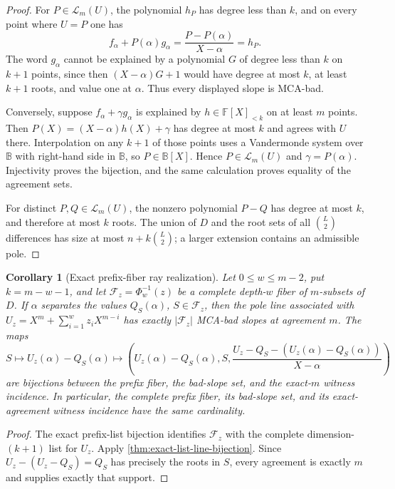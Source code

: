 \documentclass[11pt,a4paper]{amsart}
\numberwithin{equation}{section}
\newtheorem{corollary}[corollary]{Corollary}
\theoremstyle{remark}
\newcommand{\F}{\mathbb F}
\newcommand{\B}{\mathbb B}
\newcommand{\Fcal}{\mathcal F}
\newcommand{\Lcal}{\mathcal L}
\newcommand{\abs}[1]{\lvert #1\rvert}
\begin{document}
\begin{proof}
For \(P\in\Lcal_m(U)\), the polynomial \(h_P\) has degree less than
\(k\), and on every point where \(U=P\) one has
\[
 f_\alpha+P(\alpha)g_\alpha
   =\frac{P-P(\alpha)}{X-\alpha}=h_P.
\]
The word \(g_\alpha\) cannot be explained by a polynomial \(G\) of degree
less than \(k\) on \(k+1\) points, since then
\((X-\alpha)G+1\) would have degree at most \(k\), at least \(k+1\)
roots, and value one at \(\alpha\).  Thus every displayed slope is
MCA-bad.

Conversely, suppose \(f_\alpha+\gamma g_\alpha\) is explained by
\(h\in\F[X]_{<k}\) on at least \(m\) points.  Then
\(P(X)=(X-\alpha)h(X)+\gamma\) has degree at most \(k\) and agrees with
\(U\) there.  Interpolation on any \(k+1\) of those points uses a
Vandermonde system over \(\B\) with right-hand side in \(\B\), so
\(P\in\B[X]\).  Hence \(P\in\Lcal_m(U)\) and
\(\gamma=P(\alpha)\).  Injectivity proves the bijection, and the same
calculation proves equality of the agreement sets.

For distinct \(P,Q\in\Lcal_m(U)\), the nonzero polynomial \(P-Q\) has
degree at most \(k\), and therefore at most \(k\) roots.  The union of
\(D\) and the root sets of all \(\binom L2\) differences has size at most
\(n+k\binom L2\); a larger extension contains an admissible pole.
\end{proof}

\begin{corollary}[Exact prefix-fiber ray realization]
\label{cor:exact-prefix-ray-realization}
Let \(0\le w\le m-2\), put \(k=m-w-1\), and let
\(\Fcal_z=\Phi_w^{-1}(z)\) be a complete depth-\(w\) fiber of
\(m\)-subsets of \(D\).  If \(\alpha\) separates the values
\(Q_S(\alpha)\), \(S\in\Fcal_z\), then the pole line associated with
\(U_z=X^m+\sum_{i=1}^wz_iX^{m-i}\) has exactly
\(\abs{\Fcal_z}\) MCA-bad slopes at agreement \(m\).  The maps
\[
 S\longmapsto U_z(\alpha)-Q_S(\alpha)
 \longmapsto
 \left(U_z(\alpha)-Q_S(\alpha),S,
 \frac{U_z-Q_S-(U_z(\alpha)-Q_S(\alpha))}{X-\alpha}\right)
\]
are bijections between the prefix fiber, the bad-slope set, and the
exact-\(m\) witness incidence.  In particular, the complete prefix fiber,
its bad-slope set, and its exact-agreement witness incidence have the same
cardinality.
\end{corollary}

\begin{proof}
The exact prefix-list bijection identifies \(\Fcal_z\) with the complete
dimension-\((k+1)\) list for \(U_z\).  Apply
\cref{thm:exact-list-line-bijection}.  Since
\(U_z-(U_z-Q_S)=Q_S\) has precisely the roots in \(S\), every agreement
is exactly \(m\) and supplies exactly that support.
\end{proof}
\end{document}
